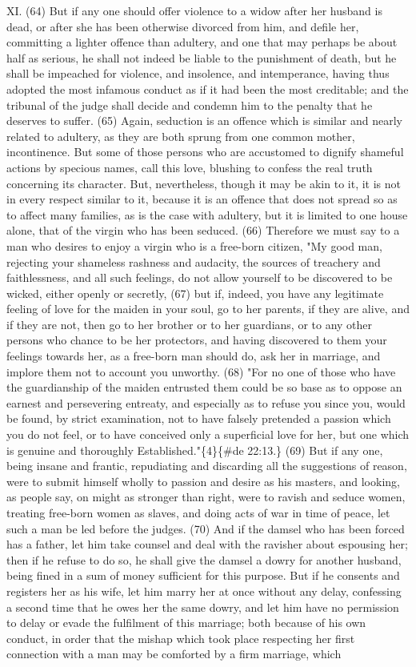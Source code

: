 \documentclass[11pt]{article}
\begin{document}
{XI. (64) But if any one should offer violence to a widow after her husband is dead, or after she has been otherwise divorced from him, and defile her, committing a lighter offence than adultery, and one that may perhaps be about half as serious, he shall not indeed be liable to the punishment of death, but he shall be impeached for violence, and insolence, and intemperance, having thus adopted the most infamous conduct as if it had been the most creditable; and the tribunal of the judge shall decide and condemn him to the penalty that he deserves to suffer. (65) Again, seduction is an offence which is similar and nearly related to adultery, as they are both sprung from one common mother, incontinence. But some of those persons who are accustomed to dignify shameful actions by specious names, call this love, blushing to confess the real truth concerning its character. But, nevertheless, though it may be akin to it, it is not in every respect similar to it, because it is an offence that does not spread so as to affect many families, as is the case with adultery, but it is limited to one house alone, that of the virgin who has been seduced. (66) Therefore we must say to a man who desires to enjoy a virgin who is a free-born citizen, "My good man, rejecting your shameless rashness and audacity, the sources of treachery and faithlessness, and all such feelings, do not allow yourself to be discovered to be wicked, either openly or secretly, (67) but if, indeed, you have any legitimate feeling of love for the maiden in your soul, go to her parents, if they are alive, and if they are not, then go to her brother or to her guardians, or to any other persons who chance to be her protectors, and having discovered to them your feelings towards her, as a free-born man should do, ask her in marriage, and implore them not to account you unworthy. (68) "For no one of those who have the guardianship of the maiden entrusted them could be so base as to oppose an earnest and persevering entreaty, and especially as to refuse you since you, would be found, by strict examination, not to have falsely pretended a passion which you do not feel, or to have conceived only a superficial love for her, but one which is genuine and thoroughly Established."\{4\}\{\#de 22:13.\} (69) But if any one, being insane and frantic, repudiating and discarding all the suggestions of reason, were to submit himself wholly to passion and desire as his masters, and looking, as people say, on might as stronger than right, were to ravish and seduce women, treating free-born women as slaves, and doing acts of war in time of peace, let such a man be led before the judges. (70) And if the damsel who has been forced has a father, let him take counsel and deal with the ravisher about espousing her; then if he refuse to do so, he shall give the damsel a dowry for another husband, being fined in a sum of money sufficient for this purpose. But if he consents and registers her as his wife, let him marry her at once without any delay, confessing a second time that he owes her the same dowry, and let him have no permission to delay or evade the fulfilment of this marriage; both because of his own conduct, in order that the mishap which took place respecting her first connection with a man may be comforted by a firm marriage, which }
\end{document}
